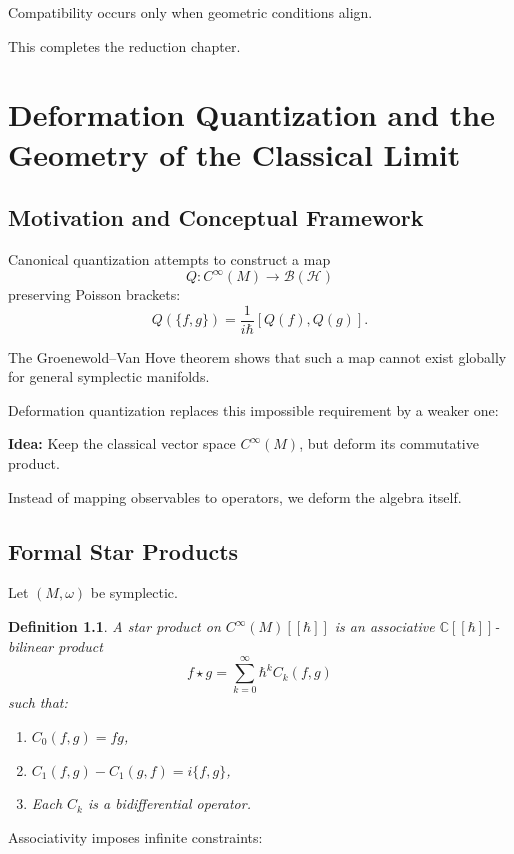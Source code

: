 \documentclass[11pt]{book}
\newtheorem{definition}[theorem]{Definition}
\begin{document}
Compatibility occurs only when geometric conditions align.

\bigskip

This completes the reduction chapter.
\chapter{Deformation Quantization and the Geometry of the Classical Limit}

\section{Motivation and Conceptual Framework}

Canonical quantization attempts to construct a map
\[
Q: C^\infty(M) \to \mathcal{B}(\mathcal{H})
\]
preserving Poisson brackets:
\[
Q(\{f,g\}) = \frac{1}{i\hbar}[Q(f),Q(g)].
\]

The Groenewold--Van Hove theorem shows that such a map cannot exist globally for general symplectic manifolds.

Deformation quantization replaces this impossible requirement by a weaker one:

\medskip
\noindent
\textbf{Idea:} Keep the classical vector space $C^\infty(M)$, but deform its commutative product.

Instead of mapping observables to operators, we deform the algebra itself.

\section{Formal Star Products}

Let $(M,\omega)$ be symplectic.

\begin{definition}
A \emph{star product} on $C^\infty(M)[[\hbar]]$ is an associative $\mathbb{C}[[\hbar]]$-bilinear product
\[
f \star g = \sum_{k=0}^\infty \hbar^k C_k(f,g)
\]
such that:
\begin{enumerate}
\item $C_0(f,g) = fg$,
\item $C_1(f,g) - C_1(g,f) = i\{f,g\}$,
\item Each $C_k$ is a bidifferential operator.
\end{enumerate}
\end{definition}

Associativity imposes infinite constraints:
\end{document}
